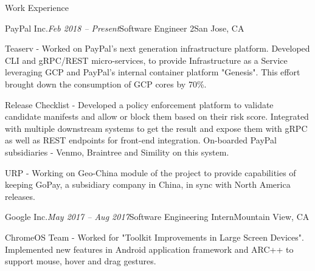 \documentclass{resume} %
\begin{document}

\begin{rSection}{Work Experience}


\begin{rSubsection}{PayPal Inc.}{\emph{Feb 2018 -- Present}}{Software Engineer 2}{San Jose, CA}
\item Teaserv - Worked on PayPal's next generation infrastructure platform. Developed CLI and gRPC/REST micro-services, to provide Infrastructure as a Service leveraging GCP and PayPal's internal container
platform "Genesis". This effort brought down the consumption of GCP cores by 70\%.

\item Release Checklist - Developed a policy enforcement platform to validate candidate manifests and allow or block them based on their risk score.
Integrated with multiple downstream systems to get the result and expose them with gRPC as well as REST endpoints for front-end integration. On-boarded PayPal subsidiaries - Venmo, Braintree and Simility on this system.

\item URP - Working on Geo-China module of the project to provide capabilities of keeping GoPay, a subsidiary company in China, in sync with North America releases.

\end{rSubsection}


\begin{rSubsection}{Google Inc.}{\emph{May 2017 -- Aug 2017}}{Software Engineering Intern}{Mountain View, CA}
\item ChromeOS Team - Worked for "Toolkit Improvements in Large Screen Devices". Implemented new features in Android application framework and ARC++ to support mouse, hover and drag gestures.
\end{rSubsection}



\end{rSection}
\end{document}
